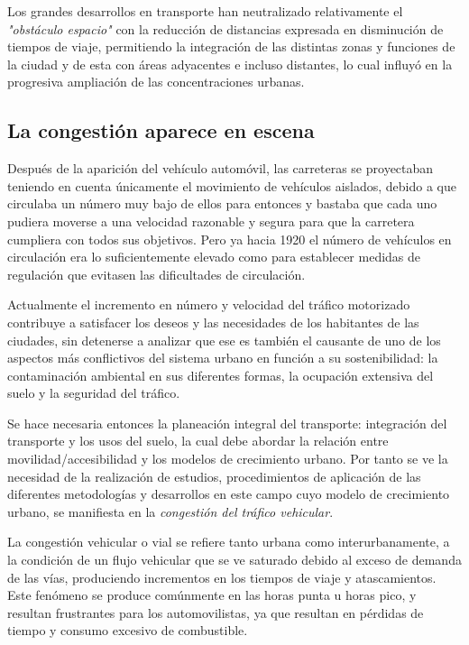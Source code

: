 Los grandes desarrollos en transporte han neutralizado relativamente el \textit{"obstáculo espacio"} con la reducción de distancias expresada en disminución de tiempos de viaje, permitiendo la integración de las distintas zonas y funciones de la ciudad y de esta con áreas adyacentes e incluso distantes, lo cual influyó en la progresiva ampliación de las concentraciones urbanas.

\subsection{La congestión aparece en escena}
Después de la aparición del vehículo automóvil, las carreteras se proyectaban teniendo en
cuenta únicamente el movimiento de vehículos aislados, debido a que circulaba un número
muy bajo de ellos para entonces y bastaba que cada uno pudiera moverse a una velocidad
razonable y segura para que la carretera cumpliera con todos sus objetivos. Pero ya hacia
1920 el número de vehículos en circulación era lo suficientemente elevado como para
establecer medidas de regulación que evitasen las dificultades de circulación.

Actualmente el incremento en número y velocidad del tráfico motorizado contribuye a
satisfacer los deseos y las necesidades de los habitantes de las ciudades, sin detenerse a
analizar que ese es también el causante de uno de los aspectos más conflictivos del sistema
urbano en función a su sostenibilidad: la contaminación ambiental en sus diferentes formas,
la ocupación extensiva del suelo y la seguridad del tráfico.

Se hace necesaria entonces la planeación integral del transporte: integración del transporte
y los usos del suelo, la cual debe abordar la relación entre movilidad/accesibilidad y los
modelos de crecimiento urbano. Por tanto se ve la necesidad de la realización de estudios,
procedimientos de aplicación de las diferentes metodologías y desarrollos en este campo
cuyo modelo de crecimiento urbano, se manifiesta en la \emph{congestión del tráfico vehicular}.

La congestión vehicular o vial se refiere tanto urbana como interurbanamente, a la condición de un flujo vehicular que se ve saturado debido al exceso de demanda de las vías, produciendo incrementos en los tiempos de viaje y atascamientos. Este fenómeno se produce comúnmente en las horas punta u horas pico, y resultan frustrantes para los automovilistas, ya que resultan en pérdidas de tiempo y consumo excesivo de combustible.

